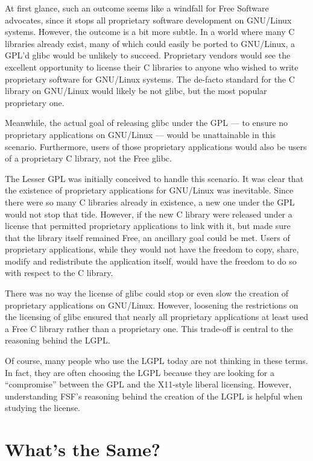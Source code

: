At first glance, such an outcome seems like a windfall for Free Software
advocates, since it stops all proprietary software development on
GNU/Linux systems. However, the outcome is a bit more subtle. In a world
where many C libraries already exist, many of which could easily be ported
to GNU/Linux, a GPL'd glibc would be unlikely to succeed. Proprietary
vendors would see the excellent opportunity to license their C libraries
to anyone who wished to write proprietary software for GNU/Linux systems.
The de-facto standard for the C library on GNU/Linux would likely be not
glibc, but the most popular proprietary one.

Meanwhile, the actual goal of releasing glibc under the GPL --- to ensure no
proprietary applications on GNU/Linux --- would be unattainable in this
scenario. Furthermore, users of those proprietary applications would also
be users of a proprietary C library, not the Free glibc.

The Lesser GPL was initially conceived to handle this scenario. It was
clear that the existence of proprietary applications for GNU/Linux was
inevitable. Since there were so many C libraries already in existence, a
new one under the GPL would not stop that tide. However, if the new C library
were released under a license that permitted proprietary applications
to link with it, but made sure that the library itself remained Free,
an ancillary goal could be met. Users of proprietary applications, while
they would not have the freedom to copy, share, modify and redistribute
the application itself, would have the freedom to do so with respect to
the C library.

There was no way the license of glibc could stop or even slow the creation
of proprietary applications on GNU/Linux. However, loosening the
restrictions on the licensing of glibc ensured that nearly all proprietary
applications at least used a Free C library rather than a proprietary one.
This trade-off is central to the reasoning behind the LGPL\@.

Of course, many people who use the LGPL today are not thinking in these
terms. In fact, they are often choosing the LGPL because they are looking
for a ``compromise'' between the GPL and the X11-style liberal licensing.
However, understanding FSF's reasoning behind the creation of the LGPL is
helpful when studying the license.


\section{What's the Same?}


